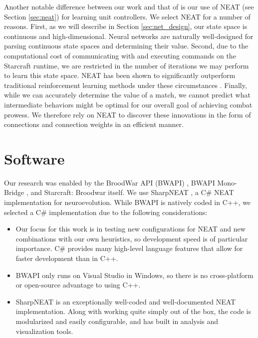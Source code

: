 \documentclass[a4paper]{article}
\begin{document}
Another notable difference between our work and that of \cite{rl_small_scale_combat} is our use of NEAT (see Section \ref{sec:neat}) for learning unit controllers. We select NEAT for a number of reasons. First, as we will describe in Section \ref{sec:net_design}, our state space is continuous and high-dimensional. Neural networks are naturally well-designed for parsing continuous state spaces and determining their value. Second, due to the computational cost of communicating with and executing commands on the Starcraft runtime, we are restricted in the number of iterations we may perform to learn this state space. NEAT has been shown to significantly outperform traditional reinforcement learning methods under these circumstances \cite{Stanley:2004:EEN:1048234}. Finally, while we can accurately determine the value of a match, we cannot predict what intermediate behaviors might be optimal for our overall goal of achieving combat prowess. We therefore rely on NEAT to discover these innovations in the form of connections and connection weights in an efficient manner.

\section{Software}
\label{sec:soft}

Our research was enabled by the BroodWar API (BWAPI) \cite{bwapi}, BWAPI Mono-Bridge \cite{monobridge}, and Starcraft: Broodwar itself. We use SharpNEAT \cite{sharpneat}, a C\# NEAT implementation for neuroevolution. While BWAPI is natively coded in C++, we selected a C\# implementation due to the following considerations:

\begin{itemize}
	\item Our focus for this work is in testing new configurations for NEAT and new combinations with our own heuristics, so development speed is of particular importance. C\# provides many high-level language features that allow for faster development than in C++.
	\item BWAPI only runs on Visual Studio in Windows, so there is no cross-platform or open-source advantage to using C++.
	\item SharpNEAT is an exceptionally well-coded and well-documented NEAT implementation. Along with working quite simply out of the box, the code is modularized and easily configurable, and has built in analysis and visualization tools.
\end{itemize}
\end{document}
